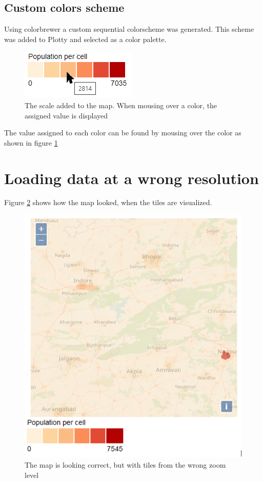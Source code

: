 \subsection{Custom colors scheme}
Using colorbrewer a custom sequential colorscheme was generated. This scheme was added to Plotty and selected as a color palette. 

\begin{figure} [H]
	\centering
	\includegraphics[width=.4\textwidth]{Pictures/CScale}
	\caption{The scale added to the map. When mousing over a color, the assigned value is displayed}
	\label{CScale}
\end{figure}

The value assigned to each color can be found by mousing over the color as shown in figure \ref{CScale}


\section{Loading data at a wrong resolution}\label{PresentingBug}

Figure \ref{MapWithWrongResolution} shows how the map looked, when the tiles are visualized. 

\begin{figure} [H]
	\centering
	\includegraphics[width=.6\textwidth]{Pictures/MapWithWrongResolution}
	\caption{The map is looking correct, but with tiles from the wrong zoom level}
	\label{MapWithWrongResolution}
\end{figure}


